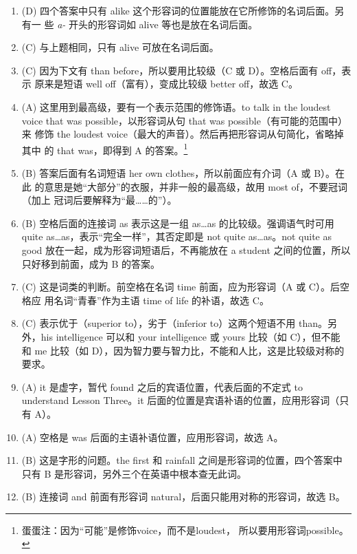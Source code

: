 \begin{enumerate}
\item (D) 四个答案中只有 alike 这个形容词的位置能放在它所修饰的名词后面。另有一
  些 \emph{a-} 开头的形容词如 alive 等也是放在名词后面。
\item  (C) 与上题相同，只有 alive 可放在名词后面。
\item (C) 因为下文有 than before，所以要用比较级（C 或 D）。空格后面有 off，表示
  原来是短语 well off（富有），变成比较级 better off，故选 C。
\item (A) 这里用到最高级，要有一个表示范围的修饰语。to talk in the loudest
  voice that was possible，以形容词从句 that was possible（有可能的范围中）来
  修饰 the loudest voice（最大的声音）。然后再把形容词从句简化，省略掉其中
  的 that was，即得到 A 的答案。\footnote{蛋蛋注：因为“可能”是修饰voice，而不是loudest，
    所以要用形容词possible。}
\item (B) 答案后面有名词短语 her own clothes，所以前面应有介词（A 或 B）。在此
  的意思是她“大部分”的衣服，并非一般的最高级，故用 most of，不要冠词（加上
  冠词后要解释为“最……的”）。
\item (B) 空格后面的连接词 as 表示这是一组 as…as 的比较级。强调语气时可用 quite as…as，表示“完全一样”，其否定即是 not quite as…as。not quite as good 放在一起，成为形容词短语后，不再能放在 a student 之间的位置，所以只好移到前面，成为 B 的答案。

\item (C) 这是词类的判断。前空格在名词 time 前面，应为形容词（A 或 C）。后空格应
  用名词“青春”作为主语 time of life 的补语，故选 C。

\item (C) 表示优于（superior to），劣于（inferior to）这两个短语不用 than。另
  外，his intelligence 可以和 your intelligence 或 yours 比较（如 C），但不能
  和 me 比较（如 D），因为智力要与智力比，不能和人比，这是比较级对称的要求。

\item (A) it 是虚字，暂代 found 之后的宾语位置，代表后面的不定式 to understand Lesson Three。it 后面的位置是宾语补语的位置，应用形容词（只有 A）。
\item (A) 空格是 was 后面的主语补语位置，应用形容词，故选 A。

\item  (B) 这是字形的问题。the first 和 rainfall 之间是形容词的位置，四个答案中只有 B 是形容词，另外三个在英语中根本查无此词。

\item  (B) 连接词 and 前面有形容词 natural，后面只能用对称的形容词，故选 B。


\end{enumerate}
